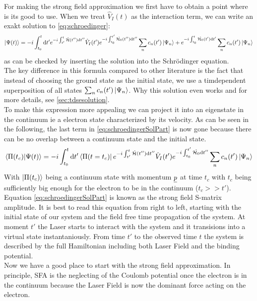 For making the strong field approximation we first have to obtain a point where is its good to use. 
When we treat $\hat{V}_I(t)$ as the interaction term, we can write an exakt solution to \eqref{eq:schroedinger}:
\begin{equation}
    \ket{\Psi(t)} = -i \int_{t_0}^{t} \mathrm{d} t' e^{-i \int_{t'}^{t} \hat{\mathcal{H}}(t'') \mathrm{d} t''} \hat{V}_I(t') e^{-i \int_{t_0}^{t'} \hat{\mathcal{H}_0}(t'') \mathrm{d} t''} \sum_{n}c_n(t')\ket{\Psi_n} + e^{-i \int_{t_0}^{t} \hat{\mathcal{H}_0}(t') \mathrm{d} t'} \sum_{n}c_n(t')\ket{\Psi_n}\label{eq:schroedingerSolPart}
\end{equation}
as can be checked by inserting the solution into the Schrödinger equation.\\
The key difference in this formula compared to other literature is the fact that instead of choosing the ground state as the initial state, we use a timdependent superposition of all states $\sum_{n}c_n(t')\ket{\Psi_n}$.
Why this solution even works and for more details, see \ref{sec:tdsesolution}.\\
To make this expression more appealing we can project it into an eigenstate in the continuum ie a electron state characterized by its velocity.
As can be seen in the following, the last term in \eqref{eq:schroedingerSolPart} is now gone because there can be no overlap between a continuum state and the initial state.
\begin{equation}
    \braket{\Pi(t_c)|\Psi(t)} = -i \int_{t_0}^{t} \mathrm{d} t' \bra{\Pi(t=t_c)} e^{-i \int_{t'}^{t} \hat{\mathcal{H}}(t'') \mathrm{d} t''}\hat{V}_I(t') e^{-i \int_{t_0}^{t'} \hat{\mathcal{H}_0} \mathrm{d} t''} \sum_{n}c_n(t')\ket{\Psi_n}
\end{equation}
With $\ket{\Pi(t_c)}$ being a continuum state with momentum $\underline{p}$ at time $t_c$ with $t_c$ being sufficiently big enough for the electron to be in the continuum ($t_c >> t'$).\\
Equation \eqref{eq:schroedingerSolPart} is known as the strong field S-matrix amplitude. 
It is best to read this equation from right to left, starting with the initial state of our system and the field free time propagation of the system. 
At moment $t'$ the Laser starts to interact with the system and it transisions into a virtual state instantaniously. 
From time $t'$ to the observed time $t$ the system is described by the full Hamiltonian including both Laser Field and the binding potential.\\
Now we have a good place to start with the strong field approximation. 
In principle, SFA is the neglecting of the Coulomb potential once the electron is in the continuum because the Laser Field is now the dominant force acting on the electron.
